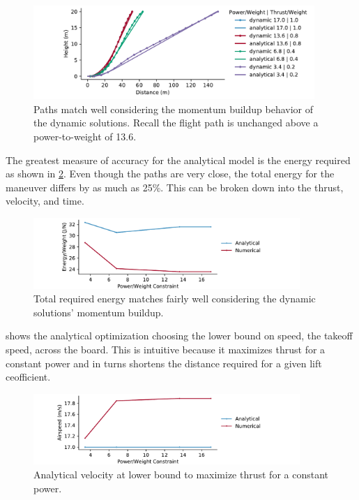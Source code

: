 \documentclass[10pt,english]{article}
\begin{document}
\begin{figure}[H]
\centering
\includegraphics[trim={2.05cm 0.0cm .4cm 0cm},clip,width=0.95\textwidth]{pn_pd_compare}
\vspace{-5pt}
\caption{Paths match well considering the momentum buildup behavior of the dynamic solutions. Recall the flight path is unchanged above a power-to-weight of 13.6.}
\label{f:comparison}
\end{figure}

The greatest measure of accuracy for the analytical model is the energy required as shown in \cref{f:energy}.  Even though the paths are very close, the total energy for the maneuver differs by as much as 25\%.  This can be broken down into the thrust, velocity, and time.  

\begin{figure}[H]
\centering
\includegraphics[trim={.7cm 0.0cm .7cm 0cm},clip,width=0.9\textwidth]{total_energy_compare}
\vspace{-5pt}
\caption{Total required energy matches fairly well considering the dynamic solutions' momentum buildup.}
\label{f:energy}
\end{figure}

 shows the analytical optimization choosing the lower bound on speed, the takeoff speed, across the board.  This is intuitive because it maximizes thrust for a constant power and in turns shortens the distance required for a given lift ceofficient.  

\begin{figure}[H]
\centering
\includegraphics[trim={.7cm 0.0cm .7cm 0cm},clip,width=0.9\textwidth]{Va_compare}
\vspace{-5pt}
\caption{Analytical velocity at lower bound to maximize thrust for a constant power.}
\label{f:Va_compare}
\end{figure}
\end{document}
